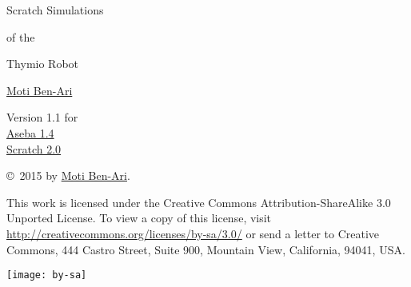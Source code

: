 
\thispagestyle{empty}

\begin{center}
\begin{Huge}
\begin{bfseries}
Scratch Simulations

of the

Thymio Robot

\end{bfseries}
\end{Huge}

\vskip 2cm

\begin{LARGE}
\href{http://www.weizmann.ac.il/sci-tea/benari/}{Moti Ben-Ari}\\%
\end{LARGE}

\vskip 1cm

\begin{Large}
Version 1.1 for\\
\bigskip
\href{https://aseba.wikidot.com/en:downloadinstall}{Aseba 1.4}\\
\bigskip
\href{https://scratch.mit.edu/}{Scratch 2.0}
\end{Large}

\end{center}

\vfill

\begin{center}
\copyright{}\  2015 by \href{http://www.weizmann.ac.il/sci-tea/benari/}{Moti Ben-Ari}.%
\end{center}

This work is licensed under the Creative Commons
Attribution-ShareAlike 3.0 Unported License. To view a copy
of this license, visit
\url{http://creativecommons.org/licenses/by-sa/3.0/}
or send a letter to Creative Commons, 444 Castro Street, Suite 900,
Mountain View, California, 94041, USA.

\begin{center}
\texttt{[image: by-sa]}
\end{center}

\newpage
\begin{spacing}{0.7}
\tableofcontents
\end{spacing}
\thispagestyle{empty}
\newpage
\setcounter{page}{1}
